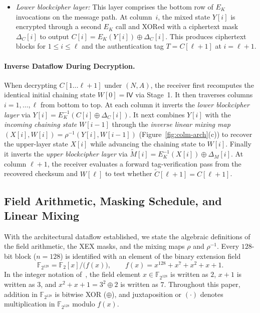 \documentclass[11pt,a4paper]{article}
\theoremstyle{definition}
\theoremstyle{remark}
\newcommand{\Ftwo}{\mathbb{F}_2}
\newcommand{\FtwoN}{\mathbb{F}_{2^{128}}}
\newcommand{\IV}{\mathsf{IV}}
\begin{document}
\begin{enumerate}[leftmargin=2em]
\begin{itemize}[leftmargin=1.5em]
        \item \emph{Lower blockcipher layer:} This layer comprises the bottom row of $E_K$ invocations on the message path. At column~$i$, the mixed state $Y[i]$ is encrypted through a second $E_K$ call and XORed with a ciphertext mask $\Delta_C[i]$ to output $C[i] = E_K(Y[i]) \oplus \Delta_C[i]$. This produces ciphertext blocks for $1 \le i \le \ell$ and the authentication tag $T = C[\ell+1]$ at $i = \ell+1$.
    \end{itemize}
\end{enumerate}
\paragraph{Inverse Dataflow During Decryption.}
When decrypting $C[1 \dots \ell+1]$ under $(N, A)$, the receiver first recomputes the identical initial chaining state $W[0] = \IV$ via Stage~1. It then traverses columns $i = 1, \dots, \ell$ from bottom to top. At each column it inverts the \emph{lower blockcipher layer} via $Y[i] = E_K^{-1}(C[i] \oplus \Delta_C[i])$. It next combines $Y[i]$ with the \emph{incoming chaining state} $W[i-1]$ through the \emph{inverse linear mixing map} $(X[i], W[i]) = \rho^{-1}(Y[i], W[i-1])$ (Figure~\ref{fig:colm-arch}(c)) to recover the upper-layer state $X[i]$ while advancing the chaining state to $W[i]$. Finally it inverts the \emph{upper blockcipher layer} via $\tilde{M}[i] = E_K^{-1}(X[i]) \oplus \Delta_M[i]$. At column $\ell+1$, the receiver evaluates a forward tag-verification pass from the recovered checksum and $W[\ell]$ to test whether $\tilde{C}[\ell+1] = C[\ell+1]$.

\subsection{Field Arithmetic, Masking Schedule, and Linear Mixing}
With the architectural dataflow established, we state the algebraic definitions of the field arithmetic, the XEX masks, and the mixing maps $\rho$ and $\rho^{-1}$. Every $128$-bit block ($n = 128$) is identified with an element of the binary extension field
\begin{equation}
\label{eq:field}
\FtwoN = \Ftwo[x] / \big(f(x)\big), \qquad f(x) = x^{128} + x^7 + x^2 + x + 1.
\end{equation}
In the integer notation of~\cite[Section~1.1, pp.~1--2]{COLMv1}, the field element $x \in \FtwoN$ is written as $2$, $x + 1$ is written as $3$, and $x^2 + x + 1 = 3^2 \oplus 2$ is written as $7$. Throughout this paper, addition in $\FtwoN$ is bitwise XOR ($\oplus$), and juxtaposition or $(\cdot)$ denotes multiplication in $\FtwoN$ modulo $f(x)$.
\end{document}
